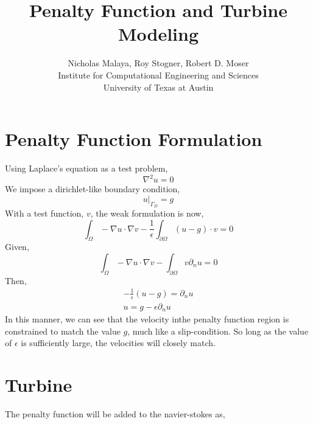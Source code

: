 \documentclass{article}
\title{\bf{Penalty Function and Turbine Modeling}}
\author{Nicholas Malaya, Roy Stogner, Robert D. Moser \\ Institute for Computational Engineering and Sciences \\ University of Texas at Austin} \date{}
\begin{document}
\maketitle

\newpage

\section{Penalty Function Formulation}

Using Laplace's equation as a test problem, 
\begin{equation}
 \nabla^2 u = 0 
\end{equation}
We impose a dirichlet-like boundary condition, 
\begin{equation}
 u|_{\Gamma_D} = g
\end{equation}
With a test function, $v$, the weak formulation is now, 
\begin{equation}
\int_{\Omega}  - \nabla u \cdot \nabla v - \frac{1}{\epsilon}
 \int_{\partial \Omega} (u-g) \cdot v = 0 
\end{equation}
Given, 
\begin{equation}
\int_{\Omega}  - \nabla u \cdot \nabla v - 
 \int_{\partial \Omega} v \partial_n u = 0 
\end{equation}
Then, 
\begin{align}
-\frac{1}{\epsilon}(u-g) = \partial_n u \\
 u = g - \epsilon \partial_n u 
\end{align}
In this manner, we can see that the velocity inthe penalty function
region is constrained to match the value $g$, much like a
slip-condition. So long as the value of $\epsilon$ is sufficiently
large, the velocities will closely match. 


\section{Turbine}

The penalty function will be added to the navier-stokes as, 
\end{document}
